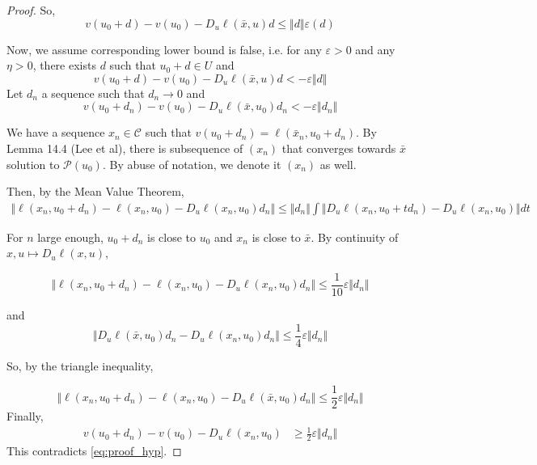 \begin{proof}
   So,
   \begin{equation}
       v(u_0+d) - v(u_0) - D_u\ell(\bar x, u)d \leq \Vert d\Vert \varepsilon(d)
   \end{equation}

    Now, we assume corresponding lower bound is false, i.e. for any $\varepsilon>0$ and any $\eta >0$, there exists $d$ such that $u_0 + d\in U$ and
   \begin{equation}
       v(u_0+d) - v(u_0) - D_u\ell(\bar x, u)d < -\varepsilon\Vert d\Vert
   \end{equation}
    Let $d_n$ a sequence such that $d_n \to 0$ and
   \begin{equation}\label{eq:proof_hyp}
       v(u_0+d_n) - v(u_0) - D_u\ell(\bar x, u_0)d_n < -\varepsilon\Vert d_n\Vert
   \end{equation}

   We have a sequence $x_n\in \mathcal C$ such that $v(u_0+ d_n) = \ell(\bar x_n, u_0 + d_n)$. By Lemma 14.4 (Lee et al), there is subsequence of $(x_n)$ that converges towards $\bar x$ solution to $\mathcal P(u_0)$. By abuse of notation, we denote it $(x_n)$ as well.

   Then, by the Mean Value Theorem,
   \begin{align}
       \Vert \ell(x_n, u_0 + d_n) - \ell(x_n, u_0) - D_u \ell(x_n, u_0)d_n\Vert \leq \Vert d_n\Vert \int \Vert D_u \ell(x_n, u_0 + td_n) - D_u \ell(x_n, u_0)\Vert dt
   \end{align}

   For $n$ large enough, $u_0 + d_n$ is close to $u_0$ and $x_n$ is close to $\bar x$. By continuity of $x, u \mapsto D_u\ell(x, u)$,

   \begin{equation}
       \Vert \ell(x_n, u_0 + d_n) - \ell(x_n, u_0) - D_u \ell(x_n, u_0)d_n\Vert \leq \frac{1}{10} \varepsilon \Vert d_n \Vert
   \end{equation}

    and
    \begin{equation}
        \Vert D_u \ell(\bar x, u_0)d_n - D_u \ell(x_n, u_0)d_n\Vert \leq \frac{1}{4}\varepsilon \Vert d_n \Vert
    \end{equation}

    So, by the triangle inequality,

    \begin{equation}
       \Vert \ell(x_n, u_0 + d_n) - \ell(x_n, u_0) - D_u \ell(\bar x, u_0)d_n\Vert \leq \frac{1}{2} \varepsilon \Vert d_n \Vert
    \end{equation}
    Finally,
    \begin{align}
        v(u_0 + d_n) - v(u_0) - D_u \ell(x_n, u_0)&\geq\frac{1}{2}\varepsilon\Vert d_n\Vert
    \end{align}
    This contradicts \cref{eq:proof_hyp}.
\end{proof}


